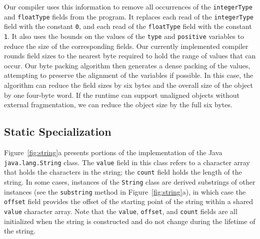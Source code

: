 \documentclass[oribibl]{llncs}
\begin{document}
Our compiler uses this information to remove all occurrences
of the {\tt integerType} and {\tt floatType} fields from the
program. It replaces each read of the {\tt integerType} field
with the constant {\tt 0}, and each read of the {\tt floatType}
field with the constant {\tt 1}. It also uses the bounds on the 
values of the {\tt type} and {\tt positive} variables to reduce the size of the 
corresponding fields. Our currently implemented compiler rounds
field sizes to the nearest byte required to hold the range
of values that can occur. Our byte packing algorithm then 
generates a dense packing of the values, attempting to preserve
the alignment of the variables if possible. In this case, the
algorithm can reduce the field sizes by six bytes and the overall
size of the object by one four-byte word.  If the runtime can support
unaligned objects without external fragmentation, we can reduce the
object size by  the full six bytes.

\subsection{Static Specialization} 

Figure~\ref{fig:string}a presents portions of the implementation
of the Java {\tt java.lang.String} class. The {\tt value} field in this
class refers to a character array that holds the characters
in the string; the {\tt count} field holds the length of the
string. In some cases, instances of the {\tt String} class
are derived substrings of other instances 
(see the {\tt substring} method in Figure~\ref{fig:string}a), in
which case the
{\tt offset} field provides the offset of the starting 
point of the string within a shared {\tt value} character array. 
Note that the {\tt value}, {\tt offset}, and {\tt count} 
fields are all initialized when the string is constructed
and do not change during the lifetime of the string.
\end{document}
